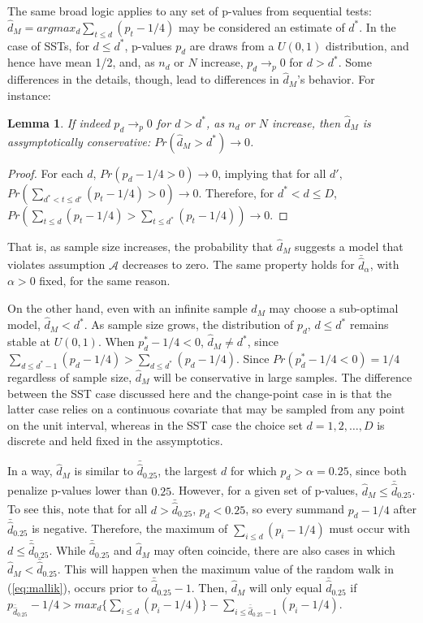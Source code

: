 \documentclass[12pt]{article}\usepackage[]{graphicx}\usepackage[]{color}
\newcommand{\dalphaU}{\bar{\hat{d}}_\alpha}
\newcommand{\dstar}{d^*}
\newcommand{\dhatU}{\bar{\hat{d}}}
\newcommand{\dhatm}{\hat{d}_M}
\newtheorem{lemma}{Lemma}
\begin{document}
The same broad logic applies to any set of p-values from sequential tests:
$\dhatm=argmax_d \sum_{t\le d} (p_t-1/4)$ may be considered an
estimate of $\dstar$.
In the case of SSTs, for $d\le \dstar$, p-values $p_d$ are draws from
a $U(0,1)$ distribution, and hence have mean 1/2, and, as $n_d$ or $N$
increase, $p_d \rightarrow_p 0$ for $d>\dstar$.
Some differences in the details, though, lead to differences in
$\dhatm$'s behavior.
For instance:
\begin{lemma}
If indeed $p_d\rightarrow_p 0$ for $d>\dstar$, as $n_d$ or $N$
increase, then $\dhatm$ is assymptotically conservative:
$Pr(\dhatm>\dstar)\rightarrow 0$.
\end{lemma}
\begin{proof}
For each $d$, $Pr(p_d -1/4>0)\rightarrow 0$, implying that for all $d'$, $Pr(\sum_{\dstar <t\le d'}
(p_t-1/4)>0)\rightarrow 0$.
Therefore, for $\dstar<d\le D$, $Pr(\sum_{t\le d} (p_t-1/4)> \sum_{t\le
  \dstar} (p_t-1/4))\rightarrow 0$.
\end{proof}
That is, as sample size increases, the probability that $\dhatm$
suggests a model that violates assumption $\mathcal{A}$ decreases to
zero.
The same property holds for $\dalphaU$, with $\alpha>0$ fixed, for
the same reason.

On the other hand, even with an infinite sample $\dhatm$ may choose a
sub-optimal model, $\dhatm<\dstar$.
As sample size grows, the distribution of $p_d$, $d\le \dstar$ remains
stable at $U(0,1)$.
When $p_\dstar-1/4<0$, $\dhatm \neq \dstar$, since $\sum_{d\le
  \dstar-1} (p_d-1/4)>\sum_{d\le \dstar} (p_d-1/4)$.
Since $Pr(p_\dstar-1/4<0)=1/4$ regardless of sample size, $\dhatm$
will be conservative in large samples.
The difference between the SST case discussed here and the
change-point case in \citet{mallik} is that the latter case relies on
a continuous covariate that may be sampled from any point on the unit
interval, whereas in the SST case the choice set $d=1,2,\dots,D$ is
discrete and held fixed in the assymptotics.

In a way, $\dhatm$ is similar to $\dhatU_{0.25}$, the largest $d$ for
which $p_d>\alpha=0.25$, since both penalize p-values lower than
$0.25$.
However, for a given set of p-values, $\dhatm \le \dhatU_{0.25}$.
To see this, note that for all $d>\dhatU_{0.25}$, $p_d<0.25$, so every
summand $p_d-1/4$ after $\dhatU_{0.25}$ is negative.
Therefore, the maximum of $\sum_{i\le d} (p_i-1/4)$ must occur with $d
\le \dhatU_{0.25}$.
While $\dhatU_{0.25}$ and $\dhatm$ may often coincide, there are also
cases in which $\dhatm<\dhatU_{0.25}$.
This will happen when the maximum value of the random walk in
(\ref{eq:mallik}), occurs prior to $\dhatU_{0.25}-1$.
Then, $\dhatm$ will only equal $\dhatU_{0.25}$ if
$p_{\dhatU_{0.25}}-1/4>max_d\{ \sum_{i\le d} (p_i-1/4)\}-\sum_{i\le
  \dhatU_{0.25}-1} (p_i-1/4)$.
\end{document}

